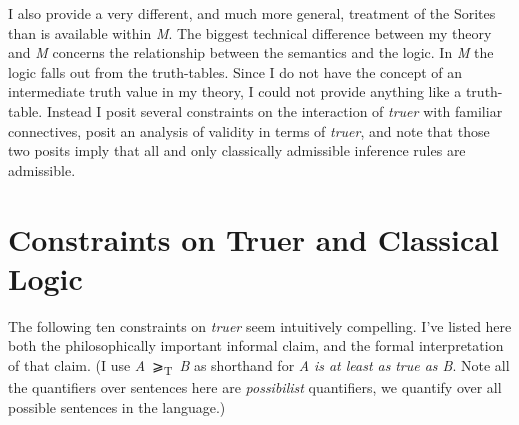 \documentclass[
  10pt,
  letterpaper,
  DIV=11,
  numbers=noendperiod,
  twoside]{scrartcl}
\begin{document}
I also provide a very different, and much more general, treatment of the
Sorites than is available within \emph{M}. The biggest technical
difference between my theory and \emph{M} concerns the relationship
between the semantics and the logic. In \emph{M} the logic falls out
from the truth-tables. Since I do not have the concept of an
intermediate truth value in my theory, I could not provide anything like
a truth-table. Instead I posit several constraints on the interaction of
\emph{truer} with familiar connectives, posit an analysis of validity in
terms of \emph{truer}, and note that those two posits imply that all and
only classically admissible inference rules are admissible.

\section{Constraints on Truer and Classical
Logic}\label{constraints-on-truer-and-classical-logic}

The following ten constraints on \emph{truer} seem intuitively
compelling. I've listed here both the philosophically important informal
claim, and the formal interpretation of that claim. (I use
\emph{A}~⩾\textsubscript{T}~\emph{B} as shorthand for \emph{A} \emph{is
at least as} \emph{true as B}. Note all the quantifiers over sentences
here are \emph{possibilist} quantifiers, we quantify over all possible
sentences in the language.)
\end{document}
